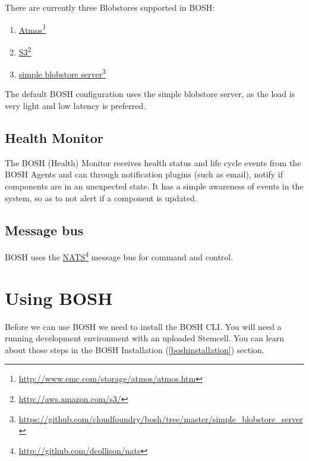 There are currently three Blobstores supported in BOSH:

\begin{enumerate}
\item \href{http://www.emc.com/storage/atmos/atmos.htm}{Atmos}\footnote{\href{http://www.emc.com/storage/atmos/atmos.htm}{http:/\slash www.emc.com\slash storage\slash atmos\slash atmos.htm}}

\item \href{http://aws.amazon.com/s3/}{S3}\footnote{\href{http://aws.amazon.com/s3/}{http:/\slash aws.amazon.com\slash s3\slash }}

\item \href{https://github.com/cloudfoundry/bosh/tree/master/simple_blobstore_server}{simple blobstore server}\footnote{\href{https://github.com/cloudfoundry/bosh/tree/master/simple_blobstore_server}{https:/\slash github.com\slash cloudfoundry\slash bosh\slash tree\slash master\slash simple\_blobstore\_server}}

\end{enumerate}

The default BOSH configuration uses the simple blobstore server, as the load is very light and low latency is preferred.

\section{Health Monitor}
\label{healthmonitor}

The BOSH (Health) Monitor receives health status and life cycle events from the BOSH Agents and can through notification plugins (such as email), notify if components are in an unexpected state. It has a simple awareness of events in the system, so as to not alert if a component is updated.

\section{Message bus}
\label{messagebus}

BOSH uses the \href{http://github.com/dcollison/nats}{NATS}\footnote{\href{http://github.com/dcollison/nats}{http:/\slash github.com\slash dcollison\slash nats}} message bus for command and control.

\chapter{Using BOSH}
\label{usingbosh}

Before we can use BOSH we need to install the BOSH CLI. You will need a running development environment with an uploaded Stemcell. You can learn about those steps in the BOSH Installation (\autoref{boshinstallation}) section.


